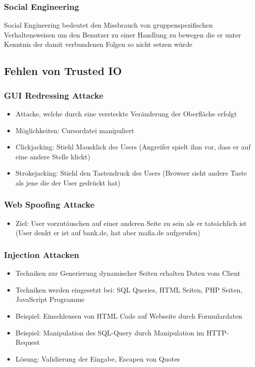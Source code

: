 \documentclass{article} %
\begin{document}
	\subsubsection{Social Engineering}
	Social Engineering bedeutet den Missbrauch von gruppenspezifischen Verhaltensweisen um den Benutzer zu einer Handlung zu bewegen die er unter Kenntnis der damit verbundenen Folgen so nicht setzen würde
	\subsection{Fehlen von Trusted IO}
	\subsubsection{GUI Redressing Attacke}
	\begin{itemize}
		\item Attacke, welche durch eine versteckte Veränderung der Oberfläche erfolgt 
		\item Möglichkeiten: Cursordatei manipuliert
		\item Clickjacking: Stiehl Mausklick des Users (Angreifer spielt ihm vor, dass er auf eine andere Stelle klickt)
		\item Strokejacking: Stiehl den Tastendruck des Users (Browser sieht andere Taste als jene die der User gedrückt hat)
	\end{itemize}
	\subsubsection{Web Spoofing Attacke}
	\begin{itemize}
		\item Ziel: User vorzutäuschen auf einer anderen Seite zu sein als er tatsächlich ist (User denkt er ist auf bank.de, hat aber mafia.de aufgerufen)
	\end{itemize}
	\subsubsection{Injection Attacken}
	\begin{itemize}
		\item Techniken zur Generierung dynamischer Seiten erhalten Daten vom Client
		\item Techniken werden eingesetzt bei: SQL Queries, HTML Seiten, PHP Seiten, JavaScript Programme
		\item Beispiel: Einschleusen von HTML Code auf Webseite durch Formulardaten
		\item Beispiel: Manipulation des SQL-Query durch Manipulation im HTTP-Request
		\item Lösung: Validierung der Eingabe, Escapen von Quotes
	\end{itemize}
\end{document}
